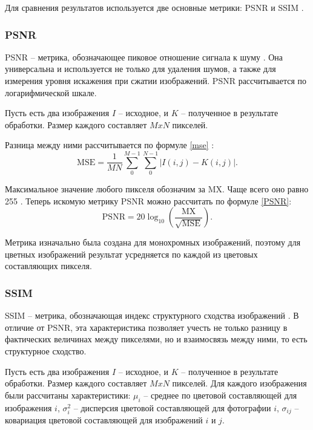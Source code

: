 Для сравнения результатов используется две основные метрики: PSNR и SSIM \cite{vs}.

\subsubsection{PSNR}
PSNR -- метрика, обозначающее пиковое отношение сигнала к шуму \cite{rs}.
Она универсальна и используется не только для удаления шумов, а также для измерения уровня искажения при сжатии изображений.
PSNR рассчитывается по логарифмической шкале.

Пусть есть два изображения $I$ -- исходное, и $K$ -- полученное в результате обработки.
Размер каждого составляет $MxN$ пикселей.

Разница между ними рассчитывается по формуле \ref{mse} \cite{rs}:
\begin{equation}
	\label{mse}
	\mathrm{MSE} = \frac{1}{MN}\sum_{0}^{M-1}\sum_{0}^{N-1}|I(i, j) - K(i, j)|.
\end{equation}

Максимальное значение любого пикселя обозначим за MX. 
Чаще всего оно равно 255 \cite{rs}.
Теперь искомую метрику PSNR можно рассчитать по формуле \ref{PSNR}:
\begin{equation}
	\label{PSNR}
	\mathrm{PSNR} = 20\log_{10}\left(\frac{\mathrm{MX}}{\sqrt{\mathrm{MSE}}}\right).
\end{equation}

Метрика изначально была создана для монохромных изображений, поэтому для цветных изображений результат усредняется по каждой из цветовых составляющих пикселя.

\subsubsection{SSIM}
SSIM -- метрика, обозначающая индекс структурного сходства изображений \cite{ssim}. 
В отличие от PSNR, эта характеристика позволяет учесть не только разницу в фактических величинах между пикселями, но и взаимосвязь между ними, то есть структурное сходство.

Пусть есть два изображения $I$ -- исходное, и $K$ -- полученное в результате обработки.
Размер каждого составляет $MxN$ пикселей. 
Для каждого изображения были рассчитаны характеристики: $\mu_{i}$ -- среднее по цветовой составляющей для изображения $i$, $\sigma^2_i$ -- дисперсия цветовой составляющей для фотографии $i$, $\sigma_{ij}$ -- ковариация цветовой составляющей для изображений $i$ и $j$. 

